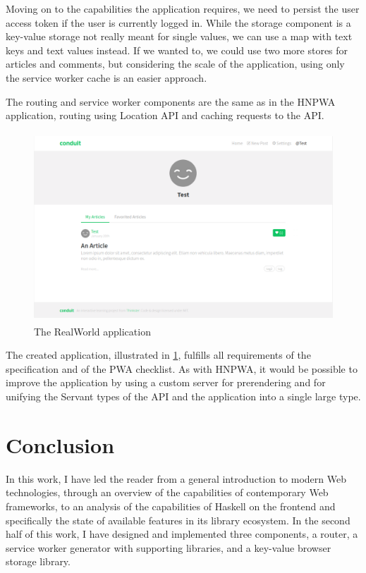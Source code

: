\documentclass[english,zadani,odsaz]{fitthesis}
\begin{document}
Moving on to the capabilities the application requires, we need to persist the
user access token if the user is currently logged in. While the storage
component is a key-value storage not really meant for single values, we can use
a map with text keys and text values instead. If we wanted to, we could use two
more stores for articles and comments, but considering the scale of the
application, using only the service worker cache is an easier approach.

The routing and service worker components are the same as in the HNPWA
application, routing using Location API and caching requests to the API.

\begin{figure}[!b]
\centering
\includegraphics[height=7.1cm]{obrazky-figures/screenshot-realworld.png}
\caption{The RealWorld application \label{realworld-app}}
\end{figure}

The created application, illustrated in \ref{realworld-app}, fulfills all
requirements of the specification and of the PWA checklist. As with HNPWA, it
would be possible to improve the application by using a custom server for
prerendering and for unifying the Servant types of the API and the application
into a single large type.

\chapter{Conclusion}
\label{sec:org10588ea}
In this work, I have led the reader from a general introduction to modern Web
technologies, through an overview of the capabilities of contemporary Web
frameworks, to an analysis of the capabilities of Haskell on the frontend and
specifically the state of available features in its library ecosystem. In the
second half of this work, I have designed and implemented three components, a
router, a service worker generator with supporting libraries, and a key-value
browser storage library.
\end{document}
